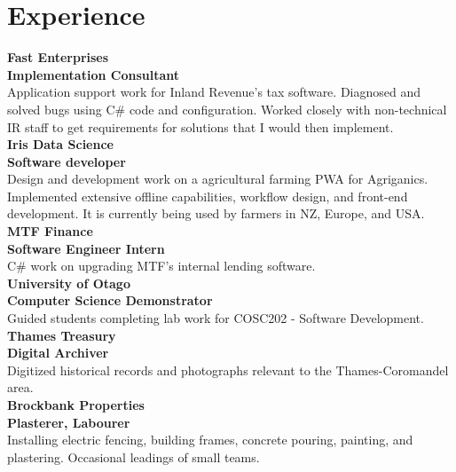 \documentclass[withoutsidebar]{simplehipstercv}
\begin{document}
     \begin{minipage}[t]{0.7\textwidth}
    \section*{Experience}
    
    \textbf{Fast Enterprises}\\
    \textbf{Implementation Consultant}\\
    Application support work for Inland Revenue's tax software. Diagnosed and solved bugs using C\# code and configuration. Worked closely with non-technical IR staff to get requirements for solutions that I would then implement. \\
    
    \textbf{Iris Data Science}\\
    \textbf{Software developer}\\
    Design and development work on a agricultural farming PWA for Agriganics. 
        Implemented extensive offline capabilities, workflow design, and front-end development.
        It is currently being used by farmers in NZ, Europe, and USA.\\
    
    \textbf{MTF Finance}\\
    \textbf{Software Engineer Intern}\\
    C\# work on upgrading MTF's internal lending software.\\
    
    \textbf{University of Otago}\\
    \textbf{Computer Science Demonstrator}\\
    Guided students completing lab work for COSC202 - Software Development.\\
    
    \textbf{Thames Treasury}\\
    \textbf{Digital Archiver}\\
    Digitized historical records and photographs relevant to the Thames-Coromandel area.\\
    
    \textbf{Brockbank Properties}\\
    \textbf{Plasterer, Labourer}\\
    Installing electric fencing, building frames, concrete pouring, painting, and plastering. Occasional leadings of small teams.\\
      
    \end{minipage}    
    
\end{document}
